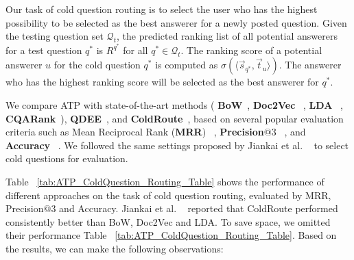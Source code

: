 \documentclass[letterpaper]{article} \usepackage{aaai19}  \usepackage{times}  \usepackage{helvet}  \usepackage{courier}  \usepackage{url}  \usepackage{graphicx}  \usepackage{booktabs} \usepackage{xcolor}
\begin{document}
Our task of cold question routing is to select the user who has the highest possibility to be selected as the best answerer for a newly posted question. Given the testing question set $\mathcal{Q}_t$, the predicted ranking list of all potential answerers for a test question $q^*$ is $R^{q^*}$ for all $q^* \in \mathcal{Q}_t$. The ranking score of a potential answerer $u$ for the cold question $q^*$ is computed as $\sigma (\langle \vec{s}_{q^*} , \vec{t}_u \rangle)$. The answerer who has the highest ranking score will be selected as the best answerer for $q^*$. 

We compare ATP with state-of-the-art methods ( {\bf BoW}~\cite{Figueroa2013LRE-BOW}, {\bf Doc2Vec} ~\cite{CQAWord2Vec}, 
{\bf LDA} ~\cite{Ji2012LDA}, {\bf CQARank}~\cite{Yang2013CQArank}), {\bf QDEE}~\cite{QDEE2018}, and {\bf ColdRoute}~\cite{ColdRoute}, based on several popular evaluation criteria such as Mean Reciprocal Rank ({\bf MRR}) ~\cite{Zhu2014}, {\bf Precision$@3$} ~\cite{zhao2017community,ColdRoute}, and {\bf Accuracy} ~\cite{zhao2017community,ColdRoute}. We followed the same settings proposed by Jiankai et al. ~\cite{ColdRoute} to select cold questions for evaluation. 

Table ~\ref{tab:ATP_ColdQuestion_Routing_Table} shows the performance of different approaches on the task of cold question routing, evaluated by MRR,  Precision$@3$ and Accuracy. Jiankai et al. ~\cite{ColdRoute} reported that ColdRoute performed consistently better than BoW, Doc2Vec and LDA. To save space, we omitted their performance Table ~\ref{tab:ATP_ColdQuestion_Routing_Table}. 
Based on the results, we can make the following observations:
\end{document}
